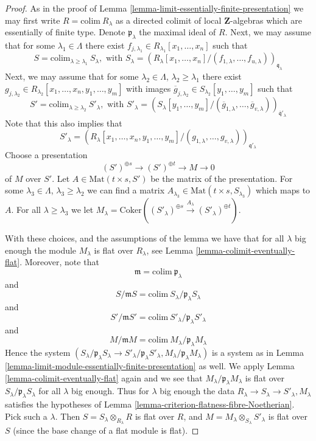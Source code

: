 \begin{proof}
As in the proof of Lemma \ref{lemma-limit-essentially-finite-presentation}
we may first write $R = \text{colim}\ R_\lambda$ as a directed colimit
of local $\mathbf{Z}$-algebras which are essentially of finite type.
Denote $\mathfrak p_\lambda$ the maximal ideal of $R$.
Next, we may assume that for some $\lambda_1 \in \Lambda$ there
exist $f_{j, \lambda_1} \in R_{\lambda_1}[x_1, \ldots, x_n]$
such that
$$
S =
\text{colim}_{\lambda \geq \lambda_1}\ S_\lambda, \text{ with }
S_\lambda = 
(R_\lambda[x_1, \ldots, x_n]/
(f_{1, \lambda}, \ldots, f_{u, \lambda}))_{\mathfrak q_\lambda}
$$
Next, we may assume that for some $\lambda_2 \in \Lambda$,
$\lambda_2 \geq \lambda_1$ there exist
$g_{j, \lambda_2} \in R_{\lambda_2}[x_1, \ldots, x_n, y_1, \ldots, y_m]$
with images
$\overline{g}_{j, \lambda_2} \in S_{\lambda_2}[y_1, \ldots, y_m]$
such that
$$
S' =
\text{colim}_{\lambda \geq \lambda_2}\ S'_\lambda, \text{ with }
S'_\lambda = 
(S_\lambda[y_1, \ldots, y_m]/
(\overline{g}_{1, \lambda}, \ldots,
\overline{g}_{v, \lambda}))_{\overline{\mathfrak q}'_\lambda}
$$
Note that this also implies that
$$
S'_\lambda = 
(R_\lambda[x_1, \ldots, x_n, y_1, \ldots, y_m]/
(g_{1, \lambda}, \ldots, g_{v, \lambda}))_{\mathfrak q'_\lambda}
$$
Choose a presentation
$$
(S')^{\oplus s} \to (S')^{\oplus t} \to M \to 0
$$
of $M$ over $S'$. Let $A \in \text{Mat}(t\times s, S')$ be
the matrix of the presentation. For some $\lambda_3 \in \Lambda$,
$\lambda_3 \geq \lambda_2$
we can find a matrix $A_{\lambda_3} \in \text{Mat}(t\times s, S_{\lambda_3})$
which maps to $A$. For all $\lambda \geq \lambda_3$ we let
$M_\lambda = \text{Coker}((S'_\lambda)^{\oplus s} \xrightarrow{A_\lambda}
(S'_\lambda)^{\oplus t})$.

\medskip\noindent
With these choices, and the assumptions of the lemma we have that
for all $\lambda$ big enough the module $M_\lambda$ is
flat over $R_\lambda$, see Lemma \ref{lemma-colimit-eventually-flat}.
Moreover, note that
$$
\mathfrak m = \text{colim}\ \mathfrak p_\lambda
$$
and
$$
S/\mathfrak mS = \text{colim}\ S_\lambda/\mathfrak p_\lambda S_\lambda
$$
and
$$
S'/\mathfrak mS' = \text{colim}\ S'_\lambda/\mathfrak p_\lambda S'_\lambda
$$
and
$$
M/\mathfrak mM = \text{colim}\ M_\lambda/\mathfrak p_\lambda M_\lambda
$$
Hence the system
$(S_\lambda/\mathfrak p_\lambda S_\lambda \to
S'_\lambda/\mathfrak p_\lambda S'_\lambda,
M_\lambda/\mathfrak p_\lambda M_\lambda)$
is a system as in
Lemma \ref{lemma-limit-module-essentially-finite-presentation} as well. 
We apply Lemma \ref{lemma-colimit-eventually-flat} again and we see that
$M_\lambda/\mathfrak p_\lambda M_\lambda$ is flat over
$S_\lambda/\mathfrak p_\lambda S_\lambda$ for all $\lambda$ big enough.
Thus for $\lambda$ big enough the data
$R_\lambda \to S_\lambda \to S'_\lambda, M_\lambda$ satisfies
the hypotheses of Lemma \ref{lemma-criterion-flatness-fibre-Noetherian}.
Pick such a $\lambda$. Then $S = S_\lambda\otimes_{R_\lambda} R$
is flat over $R$, and $M = M_\lambda \otimes_{S_\lambda} S'_{\lambda}$
is flat over $S$ (since the base change of a flat module is flat).
\end{proof}
